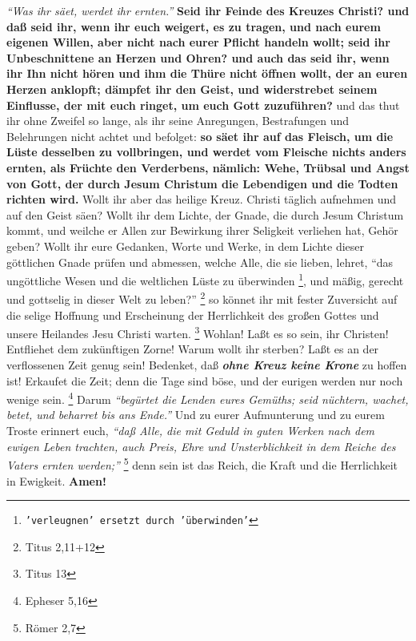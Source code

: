\textit{"`Was ihr säet, werdet ihr ernten."'}
\textbf{Seid ihr Feinde des Kreuzes Christi? und daß seid
ihr, wenn ihr euch weigert, es zu tragen, und nach eurem eigenen Willen, aber
nicht nach eurer Pflicht handeln wollt; seid ihr
Unbeschnittene an Herzen und
Ohren? und auch das seid ihr, wenn ihr Ihn nicht hören und ihm die Thüre nicht
öffnen wollt, der an euren Herzen anklopft; dämpfet ihr den Geist, und
widerstrebet seinem Einflusse, der mit euch ringet, um euch Gott zuzuführen?}
und das thut ihr ohne Zweifel so lange, als ihr seine Anregungen, Bestrafungen
und Belehrungen nicht achtet und befolget: \textbf{so säet ihr auf das Fleisch,
um die
Lüste desselben zu vollbringen, und werdet vom Fleische nichts anders ernten,
als Früchte den Verderbens, nämlich: Wehe, Trübsal und Angst von Gott, der durch
Jesum Christum die Lebendigen und die Todten richten wird.} Wollt ihr aber
das heilige Kreuz. Christi täglich aufnehmen und auf den Geist säen? Wollt ihr
dem Lichte, der Gnade, die durch Jesum Christum kommt, und weilche er Allen
zur Bewirkung ihrer Seligkeit verliehen hat, Gehör geben? Wollt ihr eure
Gedanken, Worte und Werke, in dem Lichte dieser göttlichen
Gnade prüfen und
abmessen, welche Alle, die sie lieben, lehret,
"`das ungöttliche Wesen und die
weltlichen Lüste zu überwinden
\footnote{\texttt{'verleugnen' ersetzt durch 'überwinden'}}, und mäßig, gerecht
und gottselig in dieser Welt
zu leben?"'
\footnote{Titus 2,11+12}
so könnet ihr mit fester Zuversicht auf
die selige Hoffnung und Erscheinung der Herrlichkeit des großen Gottes und
unsere Heilandes Jesu Christi warten.
\footnote{Titus 13}
Wohlan! Laßt es so
sein, ihr Christen! Entfliehet dem zukünftigen Zorne! Warum wollt ihr sterben?
Laßt es an der verflossenen Zeit genug sein! Bedenket, daß \textbf{\textit{ohne
Kreuz keine
Krone}} zu hoffen ist! Erkaufet die Zeit; denn die
Tage sind böse, und der
eurigen werden nur noch wenige sein.
\footnote{Epheser 5,16}
Darum
\textit{"`begürtet die
Lenden eures Gemüths; seid nüchtern, wachet, betet, und beharret bis ans
Ende."'}
Und zu eurer Aufmunterung und zu eurem Troste erinnert euch,
\textit{"`daß Alle, die mit
Geduld in guten Werken nach dem ewigen Leben trachten, auch Preis, Ehre und
Unsterblichkeit in dem Reiche des Vaters ernten werden;"'}
\footnote{Römer 2,7}
denn sein ist das Reich, die Kraft und die Herrlichkeit in Ewigkeit.
\textbf{Amen!}
